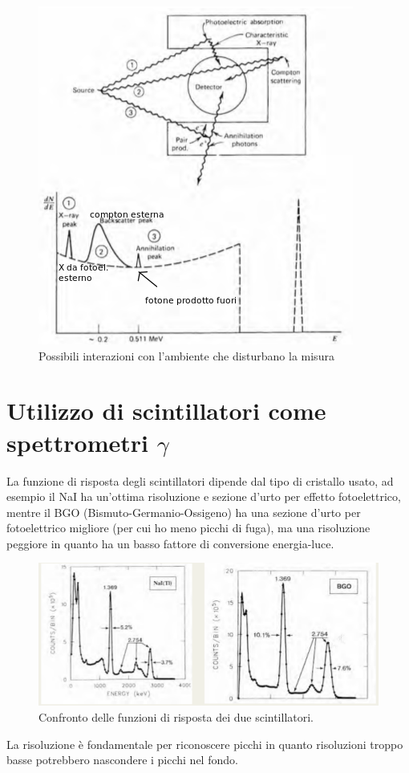 \begin{figure}[htbp]
\begin{center}
	\includegraphics[scale=1]{./Immagini/EffettiGamma.png}
\caption{Possibili interazioni con l'ambiente che disturbano la misura}
\end{center}
\end{figure}
\section{Utilizzo di scintillatori come spettrometri $\gamma$}
La funzione di risposta degli scintillatori dipende dal tipo di cristallo usato, ad esempio il NaI ha un'ottima risoluzione e sezione d'urto
per effetto fotoelettrico, mentre il BGO (Bismuto-Germanio-Ossigeno) ha una sezione d'urto per fotoelettrico migliore (per cui ho meno picchi di fuga), 
ma una risoluzione peggiore in quanto ha un basso fattore di conversione energia-luce.\\
\begin{figure}[htbp]
\begin{center}
\includegraphics[scale=0.7]{./Immagini/ConfrontoRisposta.png}
\caption{Confronto delle funzioni di risposta dei due scintillatori.}
\end{center}
\end{figure}
La risoluzione \`e fondamentale per riconoscere picchi in quanto risoluzioni troppo basse potrebbero nascondere i picchi nel fondo.
